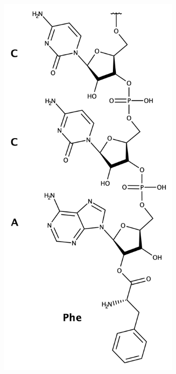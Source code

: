 \begin{figure}
\begin{subfigure}[b]{0.3\textwidth}
         \caption{}
         \label{fig:tRNA_2d_struct}
     \end{subfigure}
     \hfill
     \begin{subfigure}[b]{0.2\textwidth}
         \centering
         \includegraphics[width=\textwidth]{figures/chap3/CCA_Phe.png}

\end{subfigure}
\end{figure}
